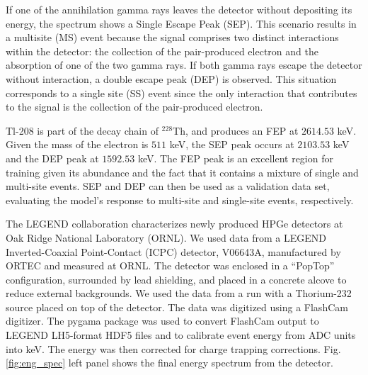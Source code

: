 If one of the annihilation gamma rays leaves the detector without depositing its energy, the spectrum shows a Single Escape Peak (SEP). This scenario results in a multisite (MS) event because the signal comprises two distinct interactions within the detector: the collection of the pair-produced electron and the absorption of one of the two gamma rays. If both gamma rays escape the detector without interaction, a double escape peak (DEP) is observed. This situation corresponds to a single site (SS) event since the only interaction that contributes to the signal is the collection of the pair-produced electron.



Tl-208 is part of the decay chain of $^{228}$Th, and produces an FEP at $2614.53$ keV. Given the mass of the electron is $511$ keV, the SEP peak occurs at $2103.53$ keV and the DEP peak at $1592.53$ keV. The FEP peak is an excellent region for training given its abundance and the fact that it contains a mixture of single and multi-site events. SEP and DEP can then be used as a validation data set, evaluating the model's response to multi-site and single-site events, respectively.

The LEGEND collaboration characterizes newly produced HPGe detectors at Oak Ridge National Laboratory (ORNL). We used data from a LEGEND Inverted-Coaxial Point-Contact (ICPC) detector, V06643A, manufactured by ORTEC and measured at ORNL. The detector was enclosed in a “PopTop” configuration, surrounded by lead shielding, and placed in a concrete alcove to reduce external backgrounds. We used the data from a run with a Thorium-232 source placed on top of the detector. The data was digitized using a FlashCam digitizer. The pygama package was used to convert FlashCam output to LEGEND LH5-format HDF5 files and to calibrate event energy from ADC units into keV\cite{pygama}. The energy was then corrected for charge trapping corrections. Fig. \ref{fig:eng_spec} left panel shows the final energy spectrum from the detector. 

